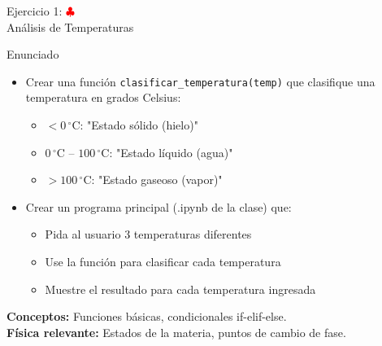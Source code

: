 \documentclass[10pt]{beamer}
\begin{document}
\begin{frame}{Ejercicio 1: \hfill \textcolor{red}{$\clubsuit$} \\ Análisis de Temperaturas}
  \begin{block}{Enunciado}
    \begin{itemize}
      \item Crear una función \texttt{clasificar\_temperatura(temp)} que clasifique una temperatura en grados Celsius:
        \begin{itemize}
          \item $< 0\,^\circ\mathrm{C}$: "Estado sólido (hielo)"
          \item $0\,^\circ\mathrm{C}$ -- $100\,^\circ\mathrm{C}$: "Estado líquido (agua)"
          \item $> 100\,^\circ\mathrm{C}$: "Estado gaseoso (vapor)"
        \end{itemize}
      \item Crear un programa principal (.ipynb de la clase) que:
        \begin{itemize}
          \item Pida al usuario 3 temperaturas diferentes
          \item Use la función para clasificar cada temperatura
          \item Muestre el resultado para cada temperatura ingresada
        \end{itemize}
    \end{itemize}
  \end{block}
  \textbf{Conceptos:} Funciones básicas, condicionales if-elif-else.\\
  \textbf{Física relevante:} Estados de la materia, puntos de cambio de fase.
\end{frame}
\end{document}
